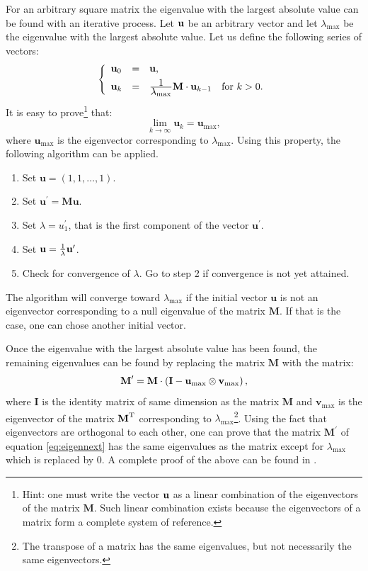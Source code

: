 For an arbitrary square matrix the eigenvalue with the largest
absolute value can be found with an iterative process. Let ${\textbf
u}$ be an arbitrary vector and let $\lambda_{\max}$ be the
eigenvalue with the largest absolute value. Let us define the
following series of vectors:
\begin{equation}
\left\{
  \begin{array}{lcl}
    \textbf{u}_0 &=& \textbf{u}, \\*[1ex]
    \textbf{u}_k &=& {\displaystyle 1\over\displaystyle\lambda_{\max}}\textbf{M}\cdot{\textbf
    u}_{k-1}\mbox{\quad for $k>0$}.
  \end{array}
\right.
\end{equation}
It is easy to prove\footnote{Hint: one must write the vector ${\textbf
u}$ as a linear combination of the eigenvectors of the matrix
$\textbf{M}$. Such linear combination exists because the eigenvectors
of a matrix form a complete system of reference.} that:
\begin{equation}
  \lim_{k\to\infty}\textbf{u}_k=\textbf{u}_{\max},
\end{equation}
where $\textbf{u}_{\max}$ is the eigenvector corresponding to
$\lambda_{\max}$. Using this property, the following algorithm can
be applied.
\begin{enumerate}
  \item Set $\textbf{u}=\left(1,1,\ldots,1\right)$.
  \item Set $\textbf{u}^{\prime}=\textbf{M}\textbf{u}$.
  \item Set $\lambda=u^{\prime}_1$, that is the first component of the
  vector $\textbf{u}^{\prime}$.
  \item Set $\textbf{u}= {1\over\lambda}\textbf{u}^{\prime}$.
  \item Check for convergence of $\lambda$. Go to step 2 if
  convergence is not yet attained.
\end{enumerate}
The algorithm will converge toward $\lambda_{\max}$ if the initial
vector $\textbf{u}$ is not an eigenvector corresponding to a null
eigenvalue of the matrix $\textbf{M}$. If that is the case, one can
chose another initial vector.

Once the eigenvalue with the largest absolute value has been
found, the remaining eigenvalues can be found by replacing the
matrix $\textbf{M}$ with the matrix:
\begin{equation}
\label{eq:eigennext}
  \textbf{M}^{\prime}=\textbf{M}\cdot\left(\textbf{I}-\textbf{u}_{\max}\otimes{\textbf
  v}_{\max}\right),
\end{equation}
where $\textbf{I}$ is the identity matrix of same dimension as the
matrix $\textbf{M}$ and $\textbf{v}_{\max}$ is the eigenvector of the
matrix $\textbf{M}^{\mathop\textrm{T}}$ corresponding to
$\lambda_{\max}$\footnote{The transpose of a matrix has the same
eigenvalues, but not necessarily the same eigenvectors.}. Using
the fact that eigenvectors are orthogonal to each other, one can
prove that the matrix $\textbf{M}^{\prime}$ of equation
\ref{eq:eigennext} has the same eigenvalues as the matrix except
for $\lambda_{\max}$ which is replaced by 0. A complete proof of
the above can be found in \cite{Bass}.

